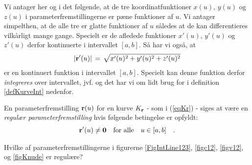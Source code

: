 Vi antager her og i det følgende, at de tre
koordinatfunktioner $x(u)$, $y(u)$ og $z(u)$ i
{parameterfremstilling}erne er pæne funktioner af
$u$. Vi antager simpelthen, at de alle tre er glatte funktioner af $u$ således at de kan
differentieres vilkårligt mange gange. Specielt er de afledede funktioner $x'(u)$,
$y'(u)$ og $z'(u)$
derfor kontinuerte i intervallet $[a,b]$. Så har
vi også, at
\begin{equation}  | {\bf r}'(u) |  \, =
\, \sqrt{x'(u)^{2} + y'(u)^{2} + z'(u)^{2}}
\end{equation}
er en kontinuert funktion i intervallet $[a, b]$. Specielt
kan denne funktion derfor {\em integreres} over intervallet, jvf.   og
det har vi om lidt  brug for i definition \ref{defKurveInt}
nedenfor.

\begin{definition} \label{defRegKurve}
En parameterfremstilling ${\bf r}(u)$ for en kurve $K_{\bf r}$ -
som i (\ref{eqKr}) - siges at være en {\em{{regulær parameterfremstilling}}} hvis
følgende betingelse er opfyldt:
\begin{equation}
{\bf r}'(u) \neq {\bf 0} \quad \text{for alle} \quad  u \in [a, b] \quad .
\end{equation}
\end{definition}

\begin{exercise}
Hvilke af parameterfremstillingerne i figurerne \ref{FigIntLine123},
\ref{figc12}, \ref{figv12}, og \ref{figKnude} er regulære?
\end{exercise}


